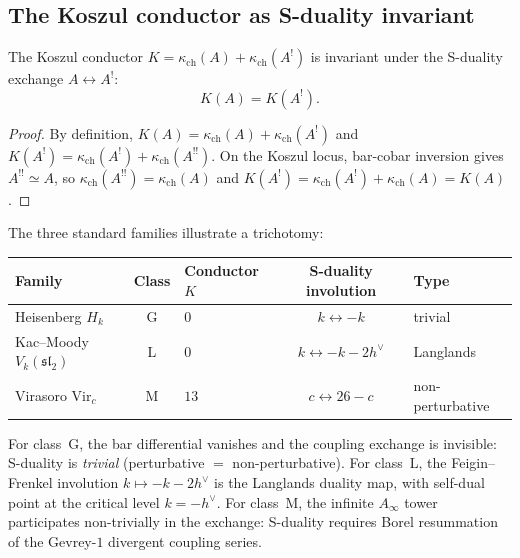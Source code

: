 \subsection{The Koszul conductor as S-duality invariant}
\label{subsec:conductor-s-invariant}

\begin{theorem}
\label{thm:conductor-s-invariant}
The Koszul conductor $K = \kappa_{\mathrm{ch}}(A) + \kappa_{\mathrm{ch}}(A^!)$ is invariant under the S-duality exchange $A \leftrightarrow A^!$:
\[
 K(A) = K(A^!).
\]
\end{theorem}

\begin{proof}
By definition, $K(A) = \kappa_{\mathrm{ch}}(A) + \kappa_{\mathrm{ch}}(A^!)$ and $K(A^!) = \kappa_{\mathrm{ch}}(A^!) + \kappa_{\mathrm{ch}}(A^{!!})$. On the Koszul locus, bar-cobar inversion gives $A^{!!} \simeq A$, so $\kappa_{\mathrm{ch}}(A^{!!}) = \kappa_{\mathrm{ch}}(A)$ and $K(A^!) = \kappa_{\mathrm{ch}}(A^!) + \kappa_{\mathrm{ch}}(A) = K(A)$.
\end{proof}

\begin{remark}
\label{rem:conductor-s-strength}
The three standard families illustrate a trichotomy:
\begin{center}
\renewcommand{\arraystretch}{1.2}
\small
\begin{tabular}{lclcl}
 \toprule
 Family & Class & Conductor $K$ & S-duality involution & Type \\
 \midrule
 Heisenberg $H_k$ & G & $0$ & $k \leftrightarrow -k$ & trivial \\
 Kac--Moody $V_k(\mathfrak{sl}_2)$ & L & $0$ & $k \leftrightarrow -k - 2h^\vee$ & Langlands \\
 Virasoro $\mathrm{Vir}_c$ & M & $13$ & $c \leftrightarrow 26 - c$ & non-perturbative \\
 \bottomrule
\end{tabular}
\end{center}
For class~G, the bar differential vanishes and the coupling exchange is invisible: S-duality is \emph{trivial} (perturbative $=$ non-perturbative). For class~L, the Feigin--Frenkel involution $k \mapsto -k - 2h^\vee$ is the Langlands duality map, with self-dual point at the critical level $k = -h^\vee$. For class~M, the infinite $A_\infty$ tower participates non-trivially in the exchange: S-duality requires Borel resummation of the Gevrey-$1$ divergent coupling series.
\end{remark}

